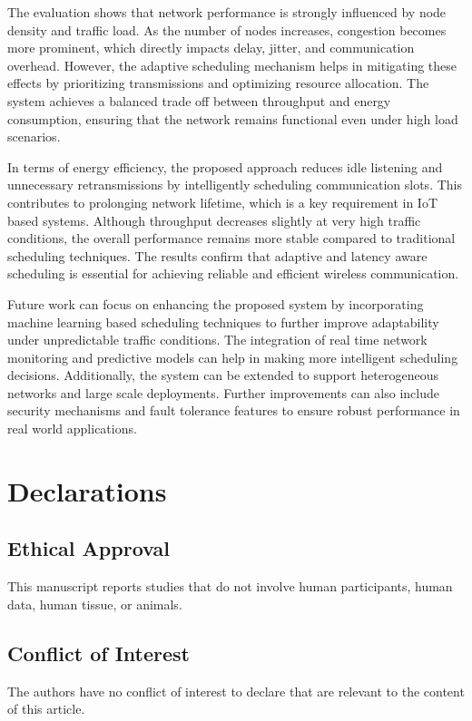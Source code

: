 \documentclass[a4paper,fleqn]{cas-dc}
\numberwithin{equation}{section}
\begin{document}
The evaluation shows that network performance is strongly influenced by node density and traffic load. As the number of nodes increases, congestion becomes more prominent, which directly impacts delay, jitter, and communication overhead. However, the adaptive scheduling mechanism helps in mitigating these effects by prioritizing transmissions and optimizing resource allocation. The system achieves a balanced trade off between throughput and energy consumption, ensuring that the network remains functional even under high load scenarios.

In terms of energy efficiency, the proposed approach reduces idle listening and unnecessary retransmissions by intelligently scheduling communication slots. This contributes to prolonging network lifetime, which is a key requirement in IoT based systems. Although throughput decreases slightly at very high traffic conditions, the overall performance remains more stable compared to traditional scheduling techniques. The results confirm that adaptive and latency aware scheduling is essential for achieving reliable and efficient wireless communication.

Future work can focus on enhancing the proposed system by incorporating machine learning based scheduling techniques to further improve adaptability under unpredictable traffic conditions. The integration of real time network monitoring and predictive models can help in making more intelligent scheduling decisions. Additionally, the system can be extended to support heterogeneous networks and large scale deployments. Further improvements can also include security mechanisms and fault tolerance features to ensure robust performance in real world applications.



\section*{Declarations}
\subsection*{Ethical Approval}
This manuscript reports studies that do not involve human participants, human data, human tissue, or animals.

\subsection*{Conflict of Interest}
The authors have no conflict of interest to declare that are relevant to the content of this article.
\end{document}
